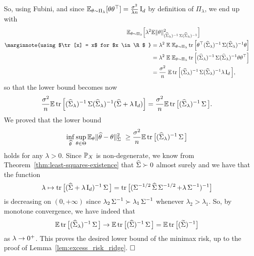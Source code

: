 So, using Fubini, and since $\E_{\theta \sim \Pi_\lambda} [\theta \theta^\top] = \frac{\sigma^2}{\lambda n} \bI_d$ by definition of $\Pi_\lambda$, we end up with
\begin{align*}
	\E_{\theta \sim \Pi_\lambda} \Big[ \lambda^2 & \E \norm{\theta}_{(\wh \bSigma_\lambda)^{-1} 
	\bSigma (\wh \bSigma_\lambda)^{-1}}^2 \Big] \\
	\marginnote{using $\tr[x] = x$ for $x \in \R$ }
	&= \lambda^2 \; \E \; \E_{\theta \sim \Pi_\lambda} \tr \Big[ \theta^\top (\wh \bSigma_\lambda)^{-1} \bSigma (\wh \bSigma_\lambda)^{-1} \theta \Big] \\
	&= \lambda^2 \; \E \; \E_{\theta \sim \Pi_\lambda} \tr \Big[(\wh \bSigma_\lambda)^{-1} \bSigma (\wh \bSigma_\lambda)^{-1} \theta \theta^\top \Big] \\
	&= \frac{\sigma^2}{n} \; \E \tr \Big[(\wh \bSigma_\lambda)^{-1} \bSigma (\wh \bSigma_\lambda)^{-1}
	\lambda \bI_d \Big],
\end{align*}
so that the lower bound becomes now
\begin{equation*}
	\frac{\sigma^2}{n} \E \tr \Big[ (\wh \bSigma_\lambda)^{-1} \bSigma (\wh \bSigma_\lambda)^{-1} (\wh \bSigma + \lambda \bI_d) \Big] = \frac{\sigma^2}{n} \E \tr \big[ (\wh \bSigma_\lambda)^{-1} \bSigma \big].
\end{equation*}
We proved that the lower bound
\begin{equation*}
	\inf_{\wh \theta} \sup_{\theta \in \Theta} \E_\theta \norm{\wh \theta - \theta}_{\bSigma}^2 \geq
	\frac{\sigma^2}{n} \E \tr \big[ (\wh \bSigma_\lambda)^{-1} \bSigma \big]
\end{equation*}
holds for any $\lambda > 0$.
Since $\P_X$ is non-degenerate, we know from Theorem~\ref{thm:least-squares-existence} that $\wh \bSigma \succ 0$ almost surely and we have that the function 
\begin{equation*}
	\lambda \mapsto \tr \big[ (\wh \bSigma + \lambda \bI_d)^{-1} \bSigma \big] 
	= \tr \big[ (\bSigma^{-1/2} \wh \bSigma \bSigma^{-1/2} + \lambda \bSigma^{-1})^{-1} \big]
\end{equation*}
is decreasing on $(0, +\infty)$ since $\lambda_2 \bSigma^{-1} \succ \lambda_1 \bSigma^{-1}$ whenever $\lambda_2 > \lambda_1$.
So, by monotone convergence, we have indeed that
\begin{equation*}
	\E \tr \big[ (\wh \bSigma_\lambda)^{-1} \bSigma \big] \go 
	\E \tr \big[ (\wh \bSigma)^{-1} \bSigma \big] = \E \tr \big[ (\wt \bSigma)^{-1} \big]
\end{equation*}
as $\lambda \go 0^+$.
This proves the desired lower bound of the minimax risk, up to the proof of Lemma~\ref{lem:excess_risk_ridge}. $\hfill \square$

